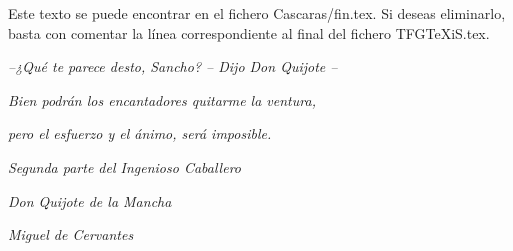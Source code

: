 %
%
%
%
%
%
%
%
%
%
%
%

\ifpdf
{}
\fi

\thispagestyle{empty}\mbox{}

Este texto se puede encontrar en el fichero Cascaras/fin.tex. Si deseas eliminarlo, basta
con comentar la línea correspondiente al final del fichero TFGTeXiS.tex.

\vspace*{4cm}

\small

\hfill \emph{--¿Qué te parece desto, Sancho? -- Dijo Don Quijote --}

\hfill \emph{Bien podrán los encantadores quitarme la ventura,}

\hfill \emph{pero el esfuerzo y el ánimo, será imposible.}

\hfill

\hfill \emph{Segunda parte del Ingenioso Caballero}

\hfill \emph{Don Quijote de la Mancha}

\hfill \emph{Miguel de Cervantes}

